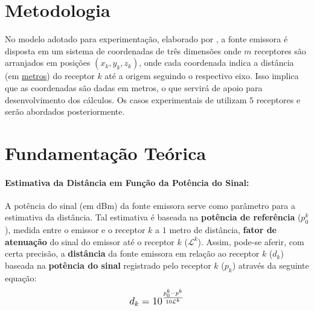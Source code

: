 	\section{Metodologia}
	\label{sec:metodologia}
	No modelo adotado para experimentação, elaborado por \cite{polidorio:triangulacao}, a fonte emissora é disposta
	em um sistema de coordenadas de três dimensões onde $m$ receptores são arranjados em posições $(x_k, y_k, z_k)$, onde
	cada coordenada indica a distância (em \underline{metros}) do receptor $k$ até a origem seguindo o respectivo eixo. Isso implica que as coordenadas
	são dadas em metros, o que servirá de apoio para desenvolvimento dos cálculos.
	Os casos experimentais de \cite{polidorio:triangulacao} utilizam $5$ receptores e serão abordados posteriormente.

	\section{Fundamentação Teórica}
	\label{sec:fund_teor}

	\paragraph{Estimativa da Distância em Função da Potência do Sinal:}
	A potência do sinal (em dBm) da fonte emissora serve como parâmetro para a estimativa da distância.
	Tal estimativa é baseada na \textbf{potência de referência} ($p^k_0$), medida entre o emissor e o receptor $k$ a $1$ metro de distância,
	\textbf{fator de atenuação} do sinal do emissor até o receptor $k$ ($\mathcal{L}^k$). Assim, pode-se aferir, com certa precisão, a \textbf{distância} da fonte emissora em relação ao receptor $k$
	($d_k$) baseada na \textbf{potência do sinal} registrado pelo receptor $k$ ($p_k$) através da seguinte equação:
	\begin{align}
		\mathlarger{d_k = 10^{\frac{p^k_0 - p^k}{10\mathcal{L}^k}}} \label{eq:distancia}
	\end{align}


